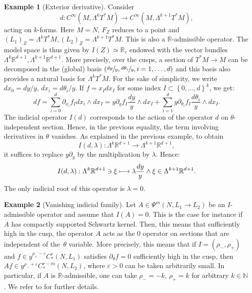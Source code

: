 \documentclass[10pt]{amsart}
\newcommand\mto{\mathchoice{\longmapsto}{\mapsto}{\mapsto}{\mapsto}}
\newcommand{\R}{\mathbb{R}}
\newcommand{\N}{\mathbb{N}}
\newcommand{\eps}{\varepsilon}
\theoremstyle{plain}
\theoremstyle{definition}
\newtheorem{example}{Example}[section]
\begin{document}
\begin{example}[Exterior derivative]
Consider
\[
d : C^\infty(M,\Lambda^k T^*M) \to C^\infty(M,\Lambda^{k+1} T^*M),
\]
acting on $k$-forms. Here $M = N$, $F_Z$ reduces to a point and $(L_1)_Z = \Lambda^k T^*M, (L_2)_Z = \Lambda^{k+1} T^*M$. This is also a $\R$-admissible operator. The model space is thus given by $I(Z) \simeq \R_r$ endowed with the vector bundles $\Lambda^k \R^{d+1},\Lambda^{k+1} \R^{d+1}$. More precisely, over the cusps, a section of $T^*M \to M$ can be decomposed in the (global) basis $\left(\sfrac{dy}{y}, \sfrac{d\theta_i}{y}, i=1,\dots,d\right)$ and this basis also provides a natural basis for $\Lambda^k T^*M$. For the sake of simplicity, we write $dx_0 = dy/y$, $dx_i = d\theta_i/y$. If $f = x_I dx_I$ for some index $I \subset \left\{0,\dots,d\right\}^k$, we get:
\[
df = \sum_{i=0}^d \partial_{x_i} f_I dx_i \wedge dx_I = y \partial_y f_I \frac{dy}{y} \wedge dx_I + \sum_{i=1}^d y \partial_{\theta_i} f_I \frac{d \theta_i}{y} \wedge dx_I.
\]
The indicial operator $I(d)$ corresponds to the action of the operator $d$ on $\theta$\nobreakdash-inde\-pen\-dent section. Hence, in the previous equality, the term involving derivatives in $\theta$ vanishes. As explained in the previous example, to obtain
\[
I(d,\lambda) :\Lambda^k \R^{d+1} \to \Lambda^{k+1} \R^{d+1},
\]
it suffices to replace $y \partial_y$ by the multiplication by $\lambda$. Hence:
\[
I(d,\lambda) : \Lambda^k \R^{d+1} \ni \xi \mto \lambda \frac{dy}{y} \wedge \xi \in \Lambda^{k+1} \R^{d+1}.
\]
The only indicial root of this operator is $\lambda = 0$.
\end{example}

\begin{example}[Vanishing indicial family]
\label{example:vanishing}
Let $A \in \Psi^m(N,L_1 \to L_2)$ be an $I$\nobreakdash-ad\-mis\-sible operator and assume that $I(A) = 0$. This is the case for instance if $A$ has compactly supported Schwartz kernel. Then, this means that sufficiently high in the cusp, the operator $A$ acts as the $0$ operator on sections that are independent of the~$\theta$ variable. More precisely, this means that if $I=(\rho_-,\rho_+)$ and $f \in y^{\rho_+-\eps} C^r_*(N,L_1)$ satisfies $\partial_\theta f = 0$ sufficiently high in the cusp, then $A f \in y^{\rho_- + \eps} C^{r-m}_*(N,L_2)$, where $\eps > 0$ can be taken arbitrarily small. In particular, if $A$ is $\R$-admissible, one can take $\rho_-=-k$, $\rho_+ = k$ for arbitrary $k \in \N$. We refer to \cite[Lem.\,4.10]{Bonthonneau-Lefeuvre-19-1} for further details.
\end{example}
\end{document}
